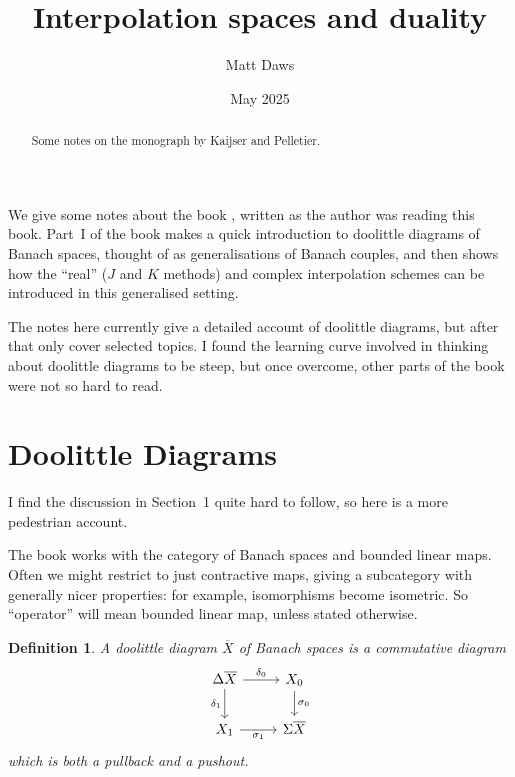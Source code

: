 \documentclass[a4paper,11pt]{article}
\theoremstyle{plain}
\newtheorem{definition}[proposition]{Definition}
\theoremstyle{remark}
\begin{document}
\title{Interpolation spaces and duality}
\author{Matt Daws}
\date{May 2025}
\maketitle

\begin{abstract}
Some notes on the monograph by Kaijser and Pelletier.
\end{abstract}

\tableofcontents

\bigskip

We give some notes about the book \cite{KP_InterpolationFunctorsDuality}, written as the author was reading this book.  Part~I of the book makes a quick introduction to doolittle diagrams of Banach spaces, thought of as generalisations of Banach couples, and then shows how the ``real'' ($J$ and $K$ methods) and complex interpolation schemes can be introduced in this generalised setting.

The notes here currently give a detailed account of doolittle diagrams, but after that only cover selected topics.  I found the learning curve involved in thinking about doolittle diagrams to be steep, but once overcome, other parts of the book were not so hard to read.



\section{Doolittle Diagrams}

I find the discussion in Section~1 quite hard to follow, so here is a more pedestrian account.

The book works with the category of Banach spaces and bounded linear maps.  Often we might restrict to just contractive maps, giving a subcategory with generally nicer properties: for example, isomorphisms become isometric.  So ``operator'' will mean bounded linear map, unless stated otherwise.

\begin{definition}
A \emph{doolittle diagram} $\overline{X}$ of Banach spaces is a commutative diagram
\[ \begin{tikzcd}
\Delta\overline X \arrow[r, "\delta_0"] \arrow[d, "\delta_1"'] & X_0 \arrow[d, "\sigma_0"] \\
X_1 \arrow[r, "\sigma_1"'] & \Sigma\overline X
\end{tikzcd}
\]
which is both a pullback and a pushout.
\end{definition}
\end{document}
